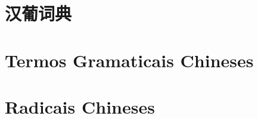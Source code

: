 \documentclass[a4paper,10pt,twoside,openany]{memoir}
\begin{document}


\clearpage
\pagestyle{empty}
\tableofcontents

\clearpage
\pagestyle{empty}
\chapter{汉葡词典}

%
%
%

\clearpage
\pagestyle{dicionario}
\begin{multicols}{2}























\end{multicols}

\clearpage
\pagestyle{plain}
\chapter{Termos Gramaticais Chineses}


\clearpage
\pagestyle{plain}
\chapter{Radicais Chineses}


\printindex[stroke]
\printindex[radical]
\printindex[pinyin]
\end{document}
